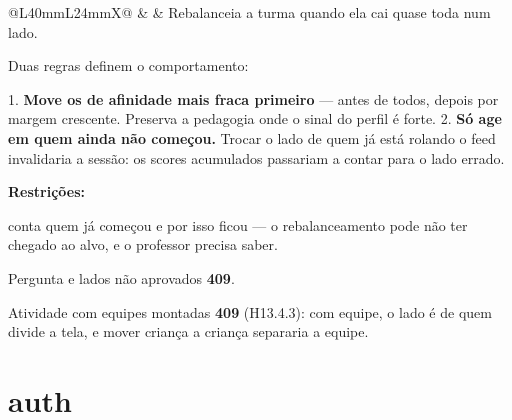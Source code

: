\begin{tabularx}{\linewidth}{@{}L{40mm}L{24mm}X@{}}
 &  & Rebalanceia a turma quando ela cai quase toda num lado.\par Duas regras definem o comportamento:\par 1. \textbf{Move os de afinidade mais fraca primeiro} ---  antes de todos, depois por margem crescente. Preserva a pedagogia onde o sinal do perfil é forte. 2. \textbf{Só age em quem ainda não começou.} Trocar o lado de quem já está rolando o feed invalidaria a sessão: os scores acumulados passariam a contar para o lado errado.\par \textbf{Restrições:}\par \hspace*{1em}\textbullet{}  conta quem já começou e por isso ficou --- o rebalanceamento pode não ter chegado ao alvo, e o professor precisa saber.\par \hspace*{1em}\textbullet{} Pergunta e lados não aprovados \implica{} \textbf{409}.\par \hspace*{1em}\textbullet{} Atividade com equipes montadas \implica{} \textbf{409}  (H13.4.3): com equipe, o lado é de quem divide a tela, e mover criança a criança separaria a equipe.\\
\bottomrule
\end{tabularx}

\section{auth}

